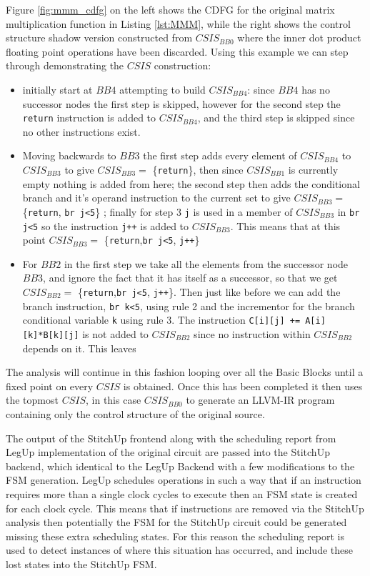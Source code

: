 Figure \ref{fig:mmm_cdfg} on the left shows the CDFG for the original matrix
multiplication function in Listing \ref{lst:MMM}, while the right shows
the control structure shadow version constructed from $CSIS_{BB0}$ where the
inner dot product floating point operations have been discarded.
Using this example we can step through demonstrating the $CSIS$ construction:
\begin{itemize}
\item initially start at $BB4$ attempting to build $CSIS_{BB4}$:
since $BB4$ has no successor nodes the first step is skipped, however for the second step the \lstinline{return}
instruction is added to $CSIS_{BB4}$, and the third step is skipped since no other instructions exist.

\item Moving backwards to $BB3$ the first step adds every element of $CSIS_{BB4}$ to $CSIS_{BB3}$ to give 
$CSIS_{BB3}=$ \{\lstinline{return}\}, then since $CSIS_{BB1}$ is currently empty nothing is added from here; the second step then adds the conditional branch and it's operand
instruction to the current set to give $CSIS_{BB3}= $\{\lstinline{return}, \lstinline{br j<5}\} ;
finally for step 3 \lstinline{j} is used in a member of $CSIS_{BB3}$ in \lstinline{br j<5} so the instruction
\lstinline{j++} is added to $CSIS_{BB3}$. This means that at this point $CSIS_{BB3} =$
\{\lstinline{return},\lstinline{br j<5}, \lstinline{j++}\}

\item For $BB2$ in the first step we take all the elements from the successor node $BB3$, and ignore the fact
that it has itself as a successor, so that we get $CSIS_{BB2} =$ \{\lstinline{return},\lstinline{br j<5}, \lstinline{j++}\}.
Then just like before we can add the branch instruction, \lstinline{br k<5}, using rule 2 and the incrementor for the branch
conditional variable \lstinline{k} using rule 3. 
The instruction \lstinline{C[i][j] += A[i][k]*B[k][j]} is not added to $CSIS_{BB2}$ since no instruction
within $CSIS_{BB2}$ depends on it. This leaves 

\end{itemize}

The analysis will continue in this fashion looping over all the Basic Blocks until a fixed
point on every $CSIS$ is obtained.
Once this has been completed it then uses the topmost $CSIS$, in this case $CSIS_{BB0}$ to
generate an LLVM-IR program containing only the control structure of the original
source.

The output of the StitchUp frontend along with the scheduling report from LegUp
implementation of the original circuit are passed into the StitchUp backend, which identical
to the LegUp Backend with a few modifications to the FSM generation.
LegUp schedules operations in such a way that if an instruction requires more than a single
clock cycles to execute then an FSM state is created for each clock cycle.
This means that if instructions are removed via the StitchUp analysis then potentially
the FSM for the StitchUp circuit could be generated missing these extra scheduling states.
For this reason the scheduling report is used to detect instances of where this situation has occurred,
and include these lost states into the StitchUp FSM.


